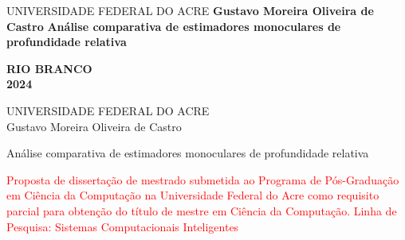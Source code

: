 	\cleardoublepage
	\thispagestyle{empty}
	
	\vspace{-60mm}
	  \begin{singlespace}
	    \begin{center}
	      {\large UNIVERSIDADE FEDERAL DO ACRE}
	      \vskip4.0cm{\textbf{\Large Gustavo Moreira Oliveira de Castro}}
	      \vskip5.0cm {\textbf{Análise comparativa de estimadores monoculares de profundidade relativa}}
	    \end{center}
	    \begin{center}
	      \vskip10.0cm{\textbf{RIO BRANCO\\2024}}
	    \end{center}
	  \end{singlespace}
	\cleardoublepage
	\thispagestyle{empty}
	
	\vspace{-60mm}
	  \begin{center}
	    {\large UNIVERSIDADE FEDERAL DO ACRE}\\
	    \vspace{3cm}
	    {\large Gustavo Moreira Oliveira de Castro} \\
	    \vspace{3cm}
	    
	    {\large Análise comparativa de estimadores monoculares de profundidade relativa} \\
	    \vspace{1.5cm}
	  \end{center}
	
	\noindent
	  \begin{flushright}
	    \begin{minipage}[t]{8cm}
	     \textcolor{red}{Proposta de dissertação de mestrado submetida ao Programa de Pós-Graduação em Ciência da Computação na Universidade Federal do Acre como requisito parcial para obtenção do título de mestre em Ciência da Computação. Linha de Pesquisa: Sistemas Computacionais Inteligentes}
	    \end{minipage}
	  \end{flushright}
	
